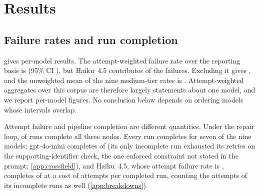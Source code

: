 \section{Results}
\label{sec:results}

\subsection{Failure rates and run completion}
\label{sec:results:rates}


 gives per-model results. The attempt-weighted failure
rate over the reporting basis is  (95\% CI
), but Haiku~4.5 contributes
 of the 
failures. Excluding it gives , and the
unweighted mean of the nine medium-tier rates is
. Attempt-weighted aggregates over this
corpus are therefore largely statements about one model, and we report
per-model figures. No conclusion below depends on ordering models whose
intervals overlap.

\begin{table}[!htbp]
\centering\small
\caption{Per-model results at the medium tier, baseline prompt, task
domains pooled (gpt-4o, gpt-4o-mini and Sonnet~4.6 are HotpotQA only on
the reporting basis). Intervals are question-clustered bootstrap 95\%
intervals (\cref{sec:setup:basis}). Rows are ordered by failure rate for
readability; configurations with overlapping intervals are not ranked.}
\label{tab:models}
\setlength{\tabcolsep}{5pt}
\end{table}

Attempt failure and pipeline completion are different quantities. Under
the repair loop,  of
 runs complete all three nodes. Every run
completes for seven of the nine models; gpt-4o-mini completes
 of 
(its only incomplete run exhausted its retries on the supporting-identifier
check, the one enforced constraint not stated in the prompt;
\cref{app:crossfield}),
and Haiku~4.5, whose attempt failure rate is
, completes
 of
 at
a cost of
 attempts per
completed run, counting the attempts of its incomplete runs as well
(\cref{app:breakdowns}).

